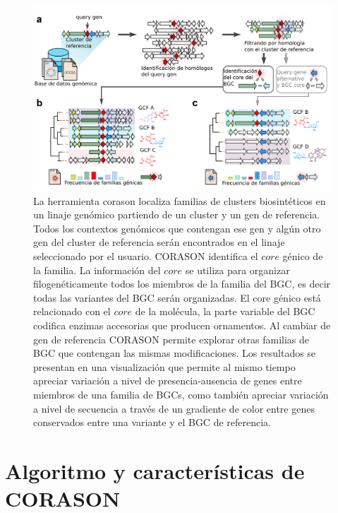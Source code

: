 \documentclass[12pt,twoside]{reedthesis}
\begin{document}
  \begin{figure}[h!tbp]
  \centering
  \includegraphics[angle = 0,scale = .6]{chapter3/Corason-pipe.pdf}
  \caption[La herramienta corason localiza familias de clusters biosintéticos en un linaje genómico partiendo de un cluster y un gen de referencia.]{\footnotesize{La herramienta corason localiza familias de clusters biosintéticos en un linaje genómico partiendo de un cluster y un gen de referencia. Todos los contextos genómicos que contengan ese gen y algún otro gen del cluster de referencia serán encontrados en el linaje seleccionado por el usuario. CORASON identifica el $core$ génico de la familia. La información del $core$ se utiliza para organizar filogenéticamente todos los miembros de la familia del BGC, es decir todas las variantes del BGC serán organizadas. El core génico está relacionado con el $core$ de la molécula, la parte variable del BGC codifica enzimas accesorias que producen ornamentos. Al cambiar de gen de referencia CORASON permite explorar otras familias de BGC que contengan las mismas modificaciones. Los resultados se presentan en una visualización que permite al mismo tiempo apreciar variación a nivel de presencia-ausencia de genes entre miembros de una familia de BGCs, como también apreciar variación a nivel de secuencia a través de un gradiente de color entre genes conservados entre una variante y el BGC de referencia.}}
  \label{fig:Corason-pipe}
  \end{figure}
  
  \section{Algoritmo y características de
  CORASON}\label{algoritmo-y-caracteristicas-de-corason}
  
\end{document}
